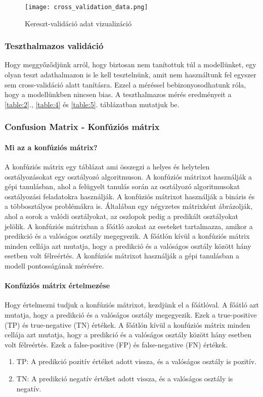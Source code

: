 \documentclass[12pt,a4paper]{article}
\begin{document}
\begin{figure}
    \centering
    \texttt{[image: cross\_validation\_data.png]}
    \caption{Kereszt-validáció adat vizualizáció}
    \label{fig:CrossValDataVisualization}
\end{figure}

\subsubsection{Teszthalmazos validáció}
Hogy meggyőződjünk arról, hogy biztosan nem tanítottuk túl a modellünket, egy olyan teszt adathalmazon is le kell tesztelnünk, amit nem használtunk fel egyszer sem
cross-validáció alatt tanításra. Ezzel a méréssel bebizonyosodhatunk róla, hogy a modellünkben nincsen bias. A teszthalmazos mérés eredményeit a \ref{table:2}., \ref{table:4} és \ref{table:5}.
táblázatban mutatjuk be.

\subsubsection{Confusion Matrix - Konfúziós mátrix}
\paragraph{Mi az a konfúziós mátrix?}
A konfúziós mátrix egy táblázat ami összegzi a helyes és helytelen osztályozásokat egy osztályozó algoritmuson. A konfúziós mátrixot használják a gépi tanulásban, ahol a felügyelt tanulás során az osztályozó algoritmusokat osztályozási feladatokra használják. A konfúziós mátrixot használják a bináris és a többosztályos problémákra is.
Általában egy négyzetes mátrixként ábrázolják, ahol a sorok a valódi osztályokat, az oszlopok pedig a predikált osztályokat jelölik. A konfúziós mátrixban a főátló azokat az eseteket tartalmazza, amikor a predikció és a valóságos osztály megegyezik. A főátlón kívül a konfúziós mátrix minden cellája azt mutatja, hogy a predikció és a valóságos osztály között hány esetben volt félreértés. A konfúziós mátrixot használják a gépi tanulásban a modell pontosságának mérésére.

\paragraph{Konfúziós mátrix értelmezése}
Hogy értelmezni tudjuk a konfúziós mátrixot, kezdjünk el a főátlóval. A főátló azt mutatja, hogy a predikció és a valóságos osztály megegyezik. Ezek a true-positive (TP) és true-negative (TN) értékek. A főátlón kívül a konfúziós mátrix minden cellája azt mutatja, hogy a predikció és a valóságos osztály között hány esetben volt félreértés. Ezek a false-positive (FP) és false-negative (FN) értékek.
\begin{enumerate}
    \item TP: A predikció pozitív értéket adott vissza, és a valóságos osztály is pozitív.
    \item TN: A predikció negatív értéket adott vissza, és a valóságos osztály is negatív.
\end{enumerate}
\end{document}
